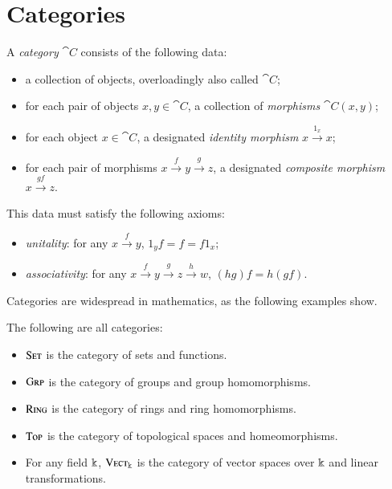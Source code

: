
\section{Categories}


\begin{dfn}[Category]\label{def:category}
A \emph{category} $\cat{C}$ consists of the following data:
\begin{itemize}
  \item a collection\footnotemark{} of objects, overloadingly also called $\cat{C}$;
	\item for each pair of objects $x,y \in  \cat{C}$, a collection of \emph{morphisms} $\cat{C}(x, y)$;
	\item for each object $x \in \cat{C}$, a designated \emph{identity morphism} $x \xrightarrow{1_x}  x$;
  \item for each pair of morphisms $x \xrightarrow{f}  y \xrightarrow{g}  z$, a designated \emph{composite morphism} $x \xrightarrow{gf}  z$.
\end{itemize}
This data must satisfy the following axioms:
\begin{itemize}
  \item \emph{unitality}: for any $x \xrightarrow{f}  y$, $1_yf = f = f1_x$;
  \item \emph{associativity}: for any $x \xrightarrow{f} 		y \xrightarrow{g} z \xrightarrow{h} w$, $(hg)f = h(gf)$.
\end{itemize}
\end{dfn}


\noindent
Categories are widespread in mathematics, as the following examples show.

\begin{ex}\label{ex:concrete categories}The following are all categories:
  \begin{itemize}
    \item ${\textsc{\text{Set}}}$ is the category of sets and functions.
    \item ${\textsc{\text{Grp}}}$ is the category of groups and group homomorphisms.
    \item ${\textsc{\text{Ring}}}$ is the category of rings and ring homomorphisms.
    \item ${\textsc{\text{Top}}}$ is the category of topological spaces and homeomorphisms.
    \item For any field $\Bbbk$, ${\textsc{\text{Vect}}}_\Bbbk$ is the category of vector
      spaces over $\Bbbk$ and linear transformations.
  \end{itemize}
\end{ex}

